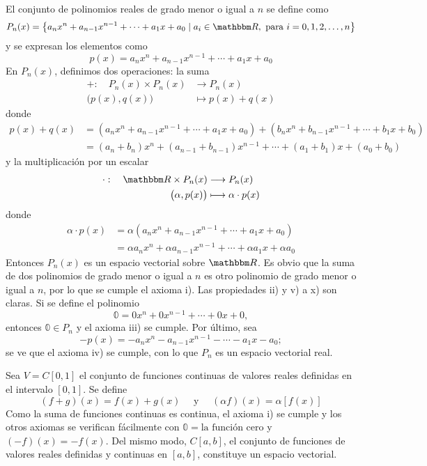 \begin{example}
    El conjunto de polinomios reales de grado menor o igual a $n$ se define como
    $$P_n(x) = \left\{ a_nx^n + a_{n-1}x^{n-1} + \cdots + a_1x + a_0 \mid a_i \in \RR, \text{ para } i = 0, 1, 2, \dots, n \right\}$$
    y se expresan los elementos como
    $$p(x) = a_nx^n + a_{n-1}x^{n-1} + \cdots + a_1x + a_0$$
    En $P_n(x)$, definimos dos operaciones: la suma
    \begin{align*}
        + : \quad P_n(x) \times P_n(x) & \longrightarrow P_n(x) \\
        \big( p(x), q(x) \big) & \longmapsto p(x)+q(x)
    \end{align*}
    donde
    \begin{align*}
        p(x)+q(x) & = \left( a_nx^n + a_{n-1}x^{n-1} + \cdots + a_1x + a_0 \right) + \left( b_nx^n + b_{n-1}x^{n-1} + \cdots + b_1x + b_0 \right) \\
        & = (a_n+b_n)x^n + (a_{n-1}+b_{n-1})x^{n-1} + \cdots + (a_1+b_1)x + (a_0+b_0)
    \end{align*}
    y la multiplicación por un escalar
    \begin{align*}
        \cdot : \quad \RR \times P_n(x) & \longrightarrow P_n(x) \\
        \big( \alpha, p(x) \big) & \longmapsto \alpha \cdot p(x)
    \end{align*}
    donde
    \begin{align*}
        \alpha \cdot p(x) & = \alpha \left( a_nx^n + a_{n-1}x^{n-1} + \cdots + a_1x + a_0 \right) \\
        & = \alpha a_nx^n + \alpha a_{n-1}x^{n-1} + \cdots + \alpha a_1x + \alpha a_0
    \end{align*}
    Entonces $P_n(x)$ es un espacio vectorial sobre $\RR$. Es obvio que la suma de dos polinomios de grado menor o igual a $n$ es otro polinomio de grado menor o igual a $n$, por lo que se cumple el axioma i). Las propiedades ii) y v) a x) son claras. Si se define el polinomio
    $$\mathbb{0} = 0 x^n+0 x^{n-1} + \cdots + 0 x + 0,$$
    entonces $\mathbb{0} \in P_n$ y el axioma iii) se cumple. Por último, sea
    $$-p(x) = -a_n x^n - a_{n-1} x^{n-1} - \cdots - a_1 x - a_0;$$
    se ve que el axioma iv) se cumple, con lo que $P_n$ es un espacio vectorial real.
\end{example}

\begin{example}\label{ejemplo5.1.8}
    Sea $V = C[0, 1]$ el conjunto de funciones continuas de valores reales definidas en el intervalo $[0,1]$. Se define
    $$(f + g)(x) = f(x) + g(x) \quad \text{ y } \quad (\alpha f)(x) = \alpha[f(x)]$$
    Como la suma de funciones continuas es continua, el axioma i) se cumple y los otros axiomas se verifican fácilmente con $\mathbb{0} = \text{la función cero}$ y $(-f)(x) = -f(x)$. Del mismo modo, $C[a, b]$, el conjunto de funciones de valores reales definidas y continuas en $[a, b]$, constituye un espacio vectorial.
\end{example}

